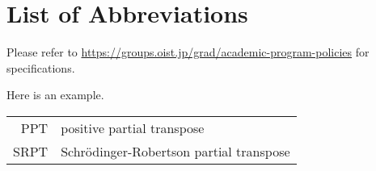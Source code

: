 \chapter*{List of Abbreviations}

Please refer to \url{https://groups.oist.jp/grad/academic-program-policies} for specifications.

Here is an example.

\begin{longtable}{rl}
    PPT  & positive partial transpose                \\
    SRPT & Schr\"odinger-Robertson partial transpose
\end{longtable}
